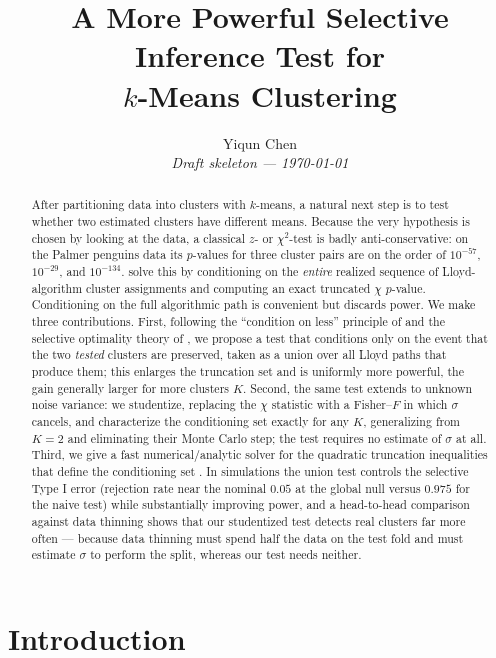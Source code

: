 \documentclass[11pt]{article}
\title{A More Powerful Selective Inference Test for \\ $k$-Means Clustering}
\author{%
  Yiqun Chen \\ \textit{Draft skeleton --- \today}
}
\date{}
\begin{document}
\maketitle

\begin{abstract}
After partitioning data into clusters with $k$-means, a natural next step is to
test whether two estimated clusters have different means. Because the very
hypothesis is chosen by looking at the data, a classical $z$- or $\chi^2$-test is
badly anti-conservative: on the Palmer penguins data its $p$-values for three
cluster pairs are on the order of $10^{-57}$, $10^{-29}$, and $10^{-134}$.
\citet{chen2023kmeans} solve this by conditioning on the \emph{entire} realized
sequence of Lloyd-algorithm cluster assignments and computing an exact truncated
$\chi$ $p$-value. Conditioning on the full algorithmic path is convenient but
discards power. We make three contributions. First, following the
``condition on less'' principle of \citet{chen2023gfl} and the selective
optimality theory of \citet{fithian2017optimal}, we propose a test that
conditions only on the event that the two \emph{tested} clusters are preserved,
taken as a union over all Lloyd paths that produce them; this enlarges the
truncation set and is uniformly more powerful, the gain generally larger for more
clusters $K$. Second, the same test extends to unknown noise variance: we
studentize, replacing the $\chi$ statistic with a Fisher--$F$ in which $\sigma$
cancels, and characterize the conditioning set exactly for any $K$, generalizing
\citet{yun2023unknownvar} from $K=2$ and eliminating their
Monte Carlo step; the test requires no estimate of $\sigma$ at all. Third, we
give a fast numerical/analytic solver for the quadratic truncation inequalities
that define the conditioning set
\citep{yun2024multiplepairs}. In simulations the union test controls the
selective Type I error (rejection rate near the nominal $0.05$ at the global null
versus $0.975$ for the naive test) while substantially improving power, and a head-to-head
comparison against data thinning \citep{neufeld2024datathin} shows that our
studentized test detects real clusters far more often --- because data thinning
must spend half the data on the test fold and must estimate $\sigma$ to perform
the split, whereas our test needs neither.
\end{abstract}

\section{Introduction}
\end{document}
